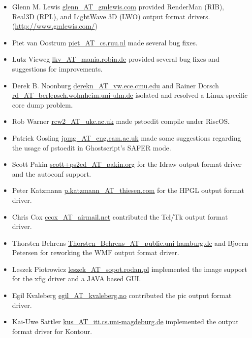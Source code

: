 \documentclass[english,a4paper]{article}
\let\URL\url \let\Email\url \let\File\url
\begin{document}
\begin{itemize}
  \item Glenn M. Lewis \Email{glenn_AT_gmlewis.com} provided RenderMan (RIB),
     Real3D (RPL), and LightWave 3D (LWO) output format drivers.
     (\URL{http://www.gmlewis.com/})

  \item Piet van Oostrum \Email{piet_AT_cs.ruu.nl} made several bug fixes.
  
  \item Lutz Vieweg \Email{lkv_AT_mania.robin.de} provided several bug fixes and
     suggestions for improvements.
     
  \item Derek B. Noonburg \Email{derekn_AT_vw.ece.cmu.edu} and Rainer Dorsch
     \Email{rd_AT_berlepsch.wohnheim.uni-ulm.de} isolated and resolved a
     Linux-specific core dump problem.

  \item Rob Warner \Email{rcw2_AT_ukc.ac.uk} made pstoedit compile under RiscOS.
  
  \item Patrick Gosling \Email{jpmg_AT_eng.cam.ac.uk} made some suggestions
     regarding the usage of pstoedit in Ghostscript's SAFER mode.

  \item Scott Pakin \Email{scott+ps2ed_AT_pakin.org} for the Idraw output format driver and the 
	autoconf support.

  \item Peter Katzmann \Email{p.katzmann_AT_thiesen.com} for the HPGL output format driver.
  
  \item Chris Cox \Email{ccox_AT_airmail.net} contributed the Tcl/Tk output format driver.
  
  \item Thorsten Behrens \Email{Thorsten_Behrens_AT_public.uni-hamburg.de} and
     Bjoern Petersen for reworking the WMF output format driver.

  \item Leszek Piotrowicz \Email{leszek_AT_sopot.rodan.pl} implemented the image
     support for the xfig driver and a JAVA based GUI.

  \item Egil Kvaleberg \Email{egil_AT_kvaleberg.no} contributed the pic output format driver.
  
  \item Kai-Uwe Sattler \Email{kus_AT_iti.cs.uni-magdeburg.de} implemented the
     output format driver for Kontour.


\end{itemize}
\end{document}
